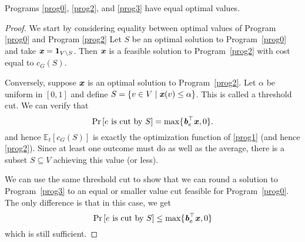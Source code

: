 \begin{lemma}
  Programs \eqref{prog0}, \eqref{prog2}, and \eqref{prog3} have equal optimal values.
\end{lemma}
\begin{proof}
  We start by considering equality between optimal values of Program
  \eqref{prog0} and Program \eqref{prog2}
  Let $S$ be an optimal solution to Program~\eqref{prog0} and take $\boldsymbol{\mathit{x}} = \boldsymbol{1}_{V\setminus S}$. Then $\boldsymbol{\mathit{x}}$ is a
  feasible solution to Program~\eqref{prog2} with cost equal to $c_G(S)$.

  Conversely, suppose $\boldsymbol{\mathit{x}}$ is an optimal solution to Program~\eqref{prog2}. Let $\alpha$ be uniform in $[0,1]$ and define
  $S = \{v\in V\mid\boldsymbol{\mathit{x}}(v) \leq \alpha\}$. This is called a threshold cut.
  We can verify that
  \[ \Pr\left[\text{$e$ is cut by $S$}\right] = \max\{\boldsymbol{\mathit{b}}_e^\top \boldsymbol{\mathit{x}}, 0\}. \]
  and hence $\mathbb{E}_t [c_G(S)]$ is exactly the optimization function of \ref{prog1} (and hence
  \ref{prog2}).
  Since at least one outcome must do as well as the average, there is a subset $S\subseteq V$ achieving this value
  (or less).

  We can use the same threshold cut to show that we can round a
  solution to Program~\eqref{prog3} to an equal or smaller value cut
  feasible for Program~\eqref{prog0}. The only difference is that in
  this case, we get
  \[
    \Pr\left[\text{$e$ is cut by $S$}\right] \leq \max\{\boldsymbol{\mathit{b}}_e^\top \boldsymbol{\mathit{x}}, 0\}
  \]
  which is still sufficient.
\end{proof}



%
